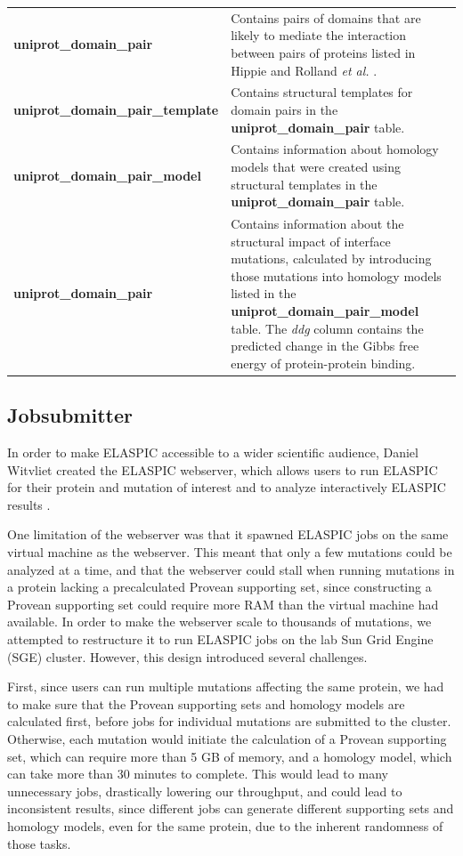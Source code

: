 \begin{table}[!tb]
\begin{tabular}{l | p{10cm}}
	\textbf{uniprot\_domain\_pair} & Contains pairs of domains that are likely to mediate the interaction between pairs of proteins listed in Hippie \cite{schaefer_hippie:_2012} and Rolland \textit{et al.} \cite{rolland_proteome-scale_2014}. \\
	\textbf{uniprot\_domain\_pair\_template} & Contains structural templates for domain pairs in the \textbf{uniprot\_domain\_pair} table. \\
	\textbf{uniprot\_domain\_pair\_model} & Contains information about homology models that were created using structural templates in the \textbf{uniprot\_domain\_pair} table. \\
	\textbf{uniprot\_domain\_pair} & Contains information about the structural impact of interface mutations, calculated by introducing those mutations into homology models listed in the \textbf{uniprot\_domain\_pair\_model} table. The \textit{ddg} column contains the predicted change in the Gibbs free energy of protein-protein binding. \\
	\bottomrule
\end{tabular}
\end{table}


\clearpage
\subsection{Jobsubmitter}

In order to make ELASPIC accessible to a wider scientific audience, Daniel Witvliet created the ELASPIC webserver, which allows users to run ELASPIC for their protein and mutation of interest and to analyze interactively ELASPIC results \cite{witvliet_elaspic_2016}.

One limitation of the webserver was that it spawned ELASPIC jobs on the same virtual machine as the webserver. This meant that only a few mutations could be analyzed at a time, and that the webserver could stall when running mutations in a protein lacking a precalculated Provean supporting set, since constructing a Provean supporting set could require more RAM than the virtual machine had available. In order to make the webserver scale to thousands of mutations, we attempted to restructure it to run ELASPIC jobs on the lab Sun Grid Engine (SGE) cluster. However, this design introduced several challenges.

First, since users can run multiple mutations affecting the same protein, we had to make sure that the Provean supporting sets and homology models are calculated first, before jobs for individual mutations are submitted to the cluster. Otherwise, each mutation would initiate the calculation of a Provean supporting set, which can require more than 5 GB of memory, and a homology model, which can take more than 30 minutes to complete. This would lead to many unnecessary jobs, drastically lowering our throughput, and could lead to inconsistent results, since different jobs can generate different supporting sets and homology models, even for the same protein, due to the inherent randomness of those tasks.

